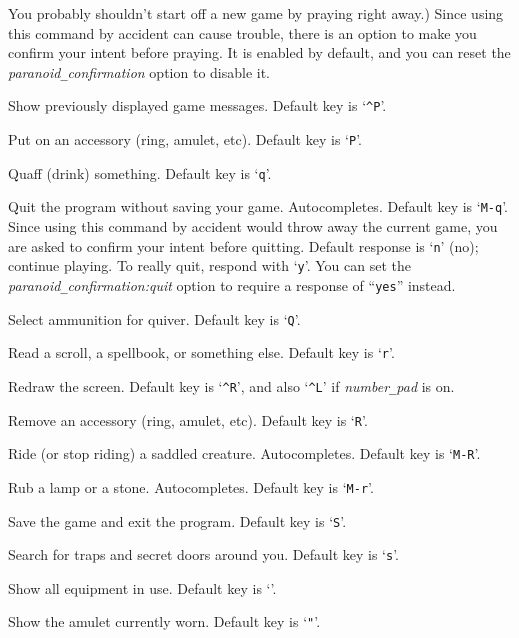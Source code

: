 You probably shouldn't start off a new game by praying right away.)
Since using this command by accident can cause trouble, there is an
option to make you confirm your intent before praying.  It is enabled
by default, and you can reset the
{\it paranoid\verb+_+confirmation\/}
option to disable it.
\item[\tb{\#prevmsg}]
Show previously displayed game messages. Default key is `{\tt \^{}P}'.
\item[\tb{\#puton}]
Put on an accessory (ring, amulet, etc). Default key is `{\tt P}'.
\item[\tb{\#quaff}]
Quaff (drink) something. Default key is `{\tt q}'.
\item[\tb{\#quit}]
Quit the program without saving your game. Autocompletes.
Default key is `{\tt M-q}'.\\
Since using this command by accident would throw away the current game,
you are asked to confirm your intent before quitting.
Default response is `{\tt n}' (no); continue playing.
To really quit, respond with `{\tt y}'.
You can set the
{\it paranoid\verb+_+confirmation:quit\/}
option to require a response of ``{\tt yes}'' instead.
\item[\tb{\#quiver}]
Select ammunition for quiver. Default key is `{\tt Q}'.
\item[\tb{\#read}]
Read a scroll, a spellbook, or something else. Default key is `{\tt r}'.
\item[\tb{\#redraw}]
Redraw the screen.
Default key is `{\tt \^{}R}',
and also `{\tt \^{}L}' if {\it number\verb+_+pad\/} is on.
\item[\tb{\#remove}]
Remove an accessory (ring, amulet, etc). Default key is `{\tt R}'.
\item[\tb{\#ride}]
Ride (or stop riding) a saddled creature. Autocompletes.
Default key is `{\tt M-R}'.
\item[\tb{\#rub}]
Rub a lamp or a stone. Autocompletes. Default key is `{\tt M-r}'.
\item[\tb{\#save}]
Save the game and exit the program.
Default key is `{\tt S}'.
\item[\tb{\#search}]
Search for traps and secret doors around you. Default key is `{\tt s}'.
\item[\tb{\#seeall}]
Show all equipment in use. Default key is `{\tt *}'.
\item[\tb{\#seeamulet}]
Show the amulet currently worn. Default key is `{\tt "}'.
\item[\tb{\#seearmor}]
